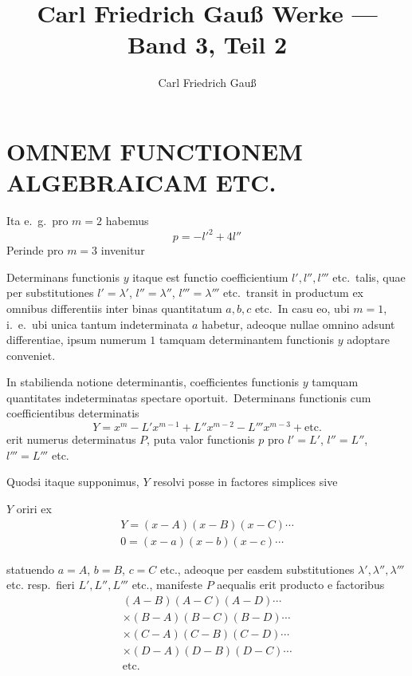 \documentclass[12pt,a4paper]{article}
\title{Carl Friedrich Gauß Werke --- Band 3, Teil 2}
\author{Carl Friedrich Gauß}
\date{}
\theoremstyle{plain}
\begin{document}
\maketitle


\section*{OMNEM FUNCTIONEM ALGEBRAICAM ETC.}

\setcounter{page}{39}

Ita e.\ g.\ pro $m = 2$ habemus
\[
p = -l'^2 + 4l''
\]
Perinde pro $m = 3$ invenitur

Determinans functionis $y$ itaque est functio coefficientium $l', l'', l'''$ etc.\ talis,
quae per substitutiones $l' = \lambda'$, $l'' = \lambda''$, $l''' = \lambda'''$ etc.\ transit in productum ex
omnibus differentiis inter binas quantitatum $a, b, c$ etc.\ In casu eo, ubi $m = 1$,
i.\ e.\ ubi unica tantum indeterminata $a$ habetur, adeoque nullae omnino adsunt
differentiae, ipsum numerum $1$ tamquam determinantem functionis $y$ adoptare
conveniet.

In stabilienda notione determinantis, coefficientes functionis $y$ tamquam
quantitates indeterminatas spectare oportuit.\ Determinans functionis cum coefficientibus determinatis
\[
Y = x^m - L'x^{m-1} + L''x^{m-2} - L'''x^{m-3} + \text{etc.}
\]
erit numerus determinatus $P$, puta valor functionis $p$ pro $l' = L'$, $l'' = L''$, $l''' = L'''$ etc.

Quodsi itaque supponimus, $Y$ resolvi posse in factores simplices
sive

$Y$ oriri ex
\begin{gather*}
Y = (x-A)(x-B)(x-C) \cdots \\
0 = (x-a)(x-b)(x-c) \cdots
\end{gather*}

statuendo $a = A$, $b = B$, $c = C$ etc., adeoque per easdem substitutiones $\lambda', \lambda'', \lambda'''$ etc.
resp.\ fieri $L', L'', L'''$ etc., manifeste $P$ aequalis erit producto e factoribus
\begin{gather*}
(A-B)(A-C)(A-D) \cdots \\
\times (B-A)(B-C)(B-D) \cdots \\
\times (C-A)(C-B)(C-D) \cdots \\
\times (D-A)(D-B)(D-C) \cdots \\
\text{etc.}
\end{gather*}
\end{document}
